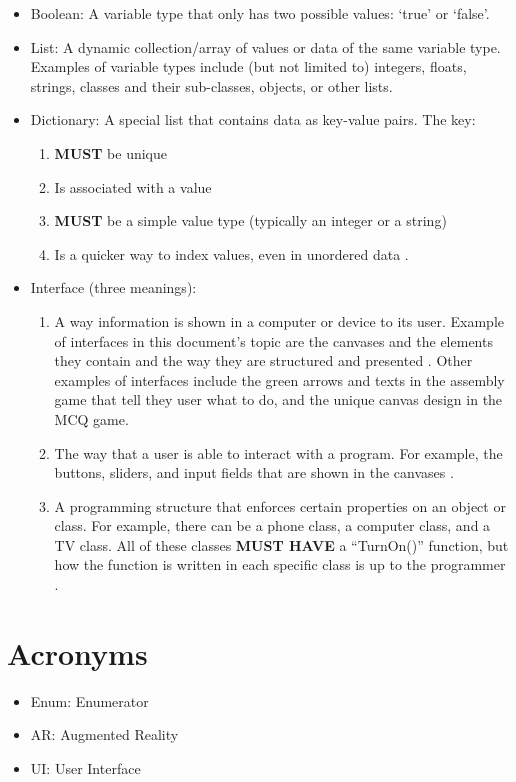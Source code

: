\documentclass[a4paper, 12pt]{article}
\begin{document}
\begin{itemize}
    \item{Boolean: A variable type that only has two possible values: ‘{\codefont true}’ or ‘{\codefont false}’.}
    \item{List: A dynamic collection/array of values or data of the same variable type. Examples of variable types include (but not limited to) integers, floats, strings, classes and their sub-classes, objects, or other lists.}
    
        \item{Dictionary: A special list that contains data as key-value pairs. The key:
        
        \begin{enumerate}
        
        \item{\textbf{MUST} be unique}
        \item{Is associated with a value}
        \item{\textbf{MUST} be a simple value type (typically an integer or a string)}
        \item{Is a quicker way to index values, even in unordered data \cite{DictionaryMeaning}.}        
        \end{enumerate}        
        }    
    \item{Interface (three meanings):
    \begin{enumerate}
    \item{A way information is shown in a computer or device to its user. Example of interfaces in this document's topic are the canvases and the elements they contain and the way they are structured and presented \cite{InterfaceMeaning}. Other examples of interfaces include the green arrows and texts in the assembly game that tell they user what to do, and the unique canvas design in the \acrshort{MCQ} game.}
    
    \item{The way that a user is able to interact with a program. For example, the buttons, sliders, and input fields that are shown in the canvases \cite{InterfaceMeaning}.}
    
    \item{A programming structure that enforces certain properties on an object or class. For example, there can be a phone class, a computer class, and a TV class. All of these classes \textbf{MUST HAVE} a “{\codefont TurnOn()}” function, but how the function is written in each specific class is up to the programmer \cite{ProgInterfaceMeaning}.}
    
    \end{enumerate}

    }
    
    
 \end{itemize}
\section{Acronyms}

\begin{itemize}
    \item{Enum: Enumerator}
    
    \item{AR: Augmented Reality}
    
    \item{UI: User Interface}
\end{itemize}

\printbibliography
\end{document}
